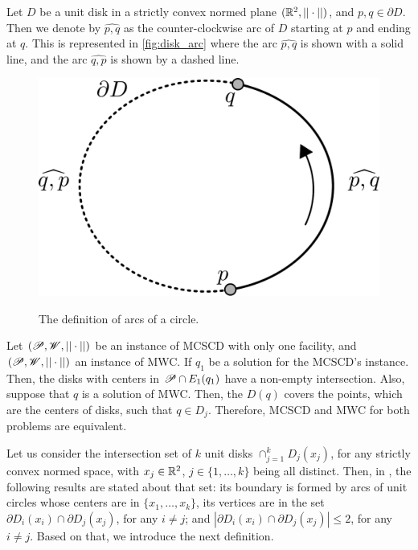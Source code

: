 Let $D$ be a unit disk in a strictly convex normed plane $(\mathbb{R}^2, ||\cdot||)$, and $p, q \in \partial D$. Then we denote by $\widehat{p, q}$ as the counter-clockwise arc of $D$ starting at $p$ and ending at $q$. This is represented in \autoref{fig:disk_arc} where the arc $\widehat{p,q}$ is shown with a solid line, and the arc $\widehat{q, p}$ is shown by a dashed line.

\begin{figure}[!htb]
	\centering
	
	\caption{The definition of arcs of a circle.}
	\includegraphics[scale=.3]{tex/figures/disk_arc.pdf}
	\fautor
	\label{fig:disk_arc}
\end{figure}

Let $(\mathscr{P}, \mathscr{W}, ||\cdot||)$ be an instance of MCSCD with only one facility, and $(\mathscr{P}, \mathscr{W}, ||\cdot||)$ an instance of MWC.
If $q_1$ be a solution for the MCSCD's instance. Then, the disks with centers in $\mathscr{P} \cap E_1(q_1)$ have a non-empty intersection.
Also, suppose that $q$ is a solution of MWC. 
Then, the $D(q)$ covers the points, which are the centers of disks, such that $q \in D_j$.
Therefore, MCSCD and MWC for both problems are equivalent.

Let us consider the intersection set of $k$ unit disks $\cap_{j=1}^k D_j(x_j)$, for any strictly convex normed space, with $x_j \in \mathbb{R}^2$, $j\in \{1, \dots, k\}$ being all distinct.
Then, in , the following results are stated about that set: its boundary is formed by arcs of unit circles whose centers are in $\{x_1, \dots, x_k\}$, its vertices are in the set $\partial D_i(x_i) \cap \partial D_j(x_j)$, for any $i \neq j$; and $|\partial D_i(x_i) \cap \partial D_j(x_j)| \le 2$, for any $i\neq j$. 
Based on that, we introduce the next definition.

